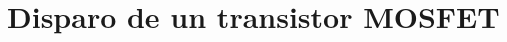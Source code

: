 \documentclass[e4_tp1_main.tex]{subfiles}
\begin{document}
\section{Disparo de un transistor MOSFET}
\newpage
\end{document}
